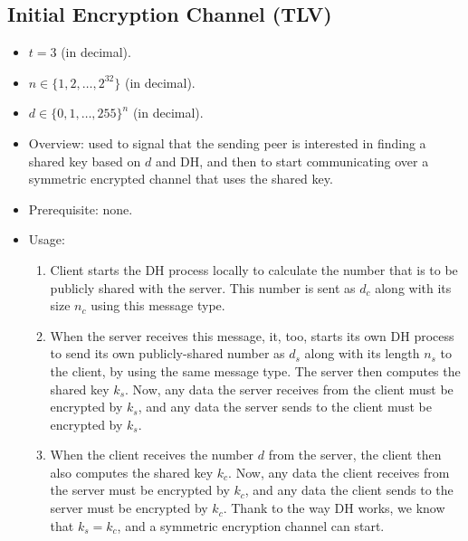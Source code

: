 \documentclass{article}
\begin{document}
\subsection{Initial Encryption Channel (TLV)}
\begin{itemize}
    \item $t = 3$ (in decimal).
    \item $n \in \{1,2,\ldots,2^{32}\}$ (in decimal).
    \item $d \in \{0,1,\ldots,255\}^n$ (in decimal).
    \item Overview: used to signal that the sending peer is interested in
    finding a shared key based on $d$ and DH, and then to start communicating
    over a symmetric encrypted channel that uses the shared key. 
    \item Prerequisite: none.
    \item Usage:
        \begin{enumerate}
            \item Client starts the DH process locally to calculate the number
            that is to be publicly shared with the server. This number is sent
            as $d_c$ along with its size $n_c$ using this message type.
            \item When the server receives this message, it, too, starts its
            own DH process to send its own publicly-shared number as $d_s$
            along with its length $n_s$ to the client, by using the same
            message type. The server then computes the shared key $k_s$. Now,
            any data the server receives from the client must be encrypted by
            $k_s$, and any data the server sends to the client must be
            encrypted by $k_s$.
            \item When the client receives the number $d$ from the server, the
            client then also computes the shared key $k_c$.  Now, any data the
            client receives from the server must be encrypted by $k_c$, and any
            data the client sends to the server must be encrypted by $k_c$.
            Thank to the way DH works, we know that $k_s = k_c$, and a
            symmetric encryption channel can start.
        \end{enumerate}
\end{itemize}
\end{document}

